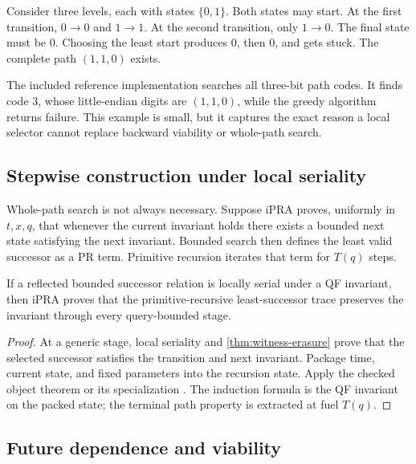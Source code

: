 Consider three levels, each with states \(\{0,1\}\).  Both states may start.
At the first transition, \(0\to0\) and \(1\to1\).  At the second transition,
only \(1\to0\).  The final state must be \(0\).  Choosing the least start
produces \(0\), then \(0\), and gets stuck.  The complete path
\((1,1,0)\) exists.

The included reference implementation searches all three-bit path codes.  It
finds code \(3\), whose little-endian digits are \((1,1,0)\), while the greedy
algorithm returns failure.  This example is small, but it captures the exact
reason a local selector cannot replace backward viability or whole-path
search.

\subsection{Stepwise construction under local seriality}

Whole-path search is not always necessary.  Suppose iPRA proves, uniformly in
\(t,x,q\), that whenever the current invariant holds there exists a bounded
next state satisfying the next invariant.  Bounded search then defines the
least valid successor as a PR term.  Primitive recursion iterates that term for
\(T(q)\) steps.

\begin{proposition}\label{prop:stepwise-path}
If a reflected bounded successor relation is locally serial under a QF
invariant, then iPRA proves that the primitive-recursive least-successor trace
preserves the invariant through every query-bounded stage.
\end{proposition}

\begin{proof}
At a generic stage, local seriality and \cref{thm:witness-erasure} prove that
the selected successor satisfies the transition and next invariant.  Package
time, current state, and fixed parameters into the recursion state.  Apply the
checked object theorem  or its
specialization .  The induction formula is the
QF invariant on the packed state; the terminal path property is extracted at
fuel \(T(q)\).
\end{proof}

\subsection{Future dependence and viability}

